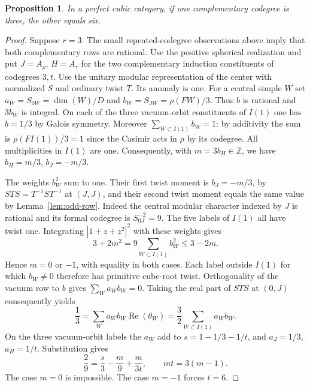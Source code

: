 \documentclass[11pt,a4paper]{article}
\newtheorem{proposition}[theorem]{Proposition}
\numberwithin{equation}{section}
\begin{document}
\begin{proposition}\label{prop:cubic-no-three}
In a perfect cubic category, if one complementary codegree is three, the other equals six.
\end{proposition}
\begin{proof}
Suppose $r=3$. The small repeated-codegree observations above imply that both complementary rows are rational. Use the positive spherical realization and put $J=A_\rho$, $H=A_\tau$ for the two complementary induction constituents of codegrees $3,t$. Use the unitary modular representation of the center with normalized $S$ and ordinary twist $T$. Its anomaly is one. For a central simple $W$ set $a_W=S_{0W}=\dim(W)/D$ and $b_W=S_{JW}=\rho(FW)/3$. Thus $b$ is rational and $3b_W$ is integral. On each of the three vacuum-orbit constituents of $I(1)$ one has $b=1/3$ by Galois symmetry. Moreover $\sum_{W\subset I(1)} b_W=1$: by additivity the sum is $\rho(FI(1))/3=1$ since the Casimir acts in $\rho$ by its codegree. All multiplicities in $I(1)$ are one. Consequently, with $m=3b_H\in\mathbb Z$, we have $b_H=m/3$, $b_J=-m/3$.

The weights $b_W^2$ sum to one. Their first twist moment is $b_J=-m/3$, by $STS=T^{-1}ST^{-1}$ at $(J,J)$, and their second twist moment equals the same value by Lemma~\ref{lem:odd-row}. Indeed the central modular character indexed by $J$ is rational and its formal codegree is $S_{0J}^{-2}=9$. The five labels of $I(1)$ all have twist one. Integrating $|1+z+z^2|^2$ with these weights gives
\[
 3+2m^2=9\sum_{W\subset I(1)}b_W^2\le 3-2m.
\]
Hence $m=0$ or $-1$, with equality in both cases. Each label outside $I(1)$ for which $b_W\ne0$ therefore has primitive cube-root twist. Orthogonality of the vacuum row to $b$ gives $\sum_W a_W b_W=0$. Taking the real part of $STS$ at $(0,J)$ consequently yields
\[
 \frac13=\sum_W a_Wb_W\operatorname{Re}(\theta_W)
       =\frac32\sum_{W\subset I(1)}a_Wb_W .
\]
On the three vacuum-orbit labels the $a_W$ add to $s=1-1/3-1/t$, and $a_J=1/3$, $a_H=1/t$. Substitution gives
\[
 \frac29=\frac{s}{3}-\frac{m}{9}+\frac{m}{3t},
 \qquad mt=3(m-1).
\]
The case $m=0$ is impossible. The case $m=-1$ forces $t=6$.
\end{proof}
\end{document}
